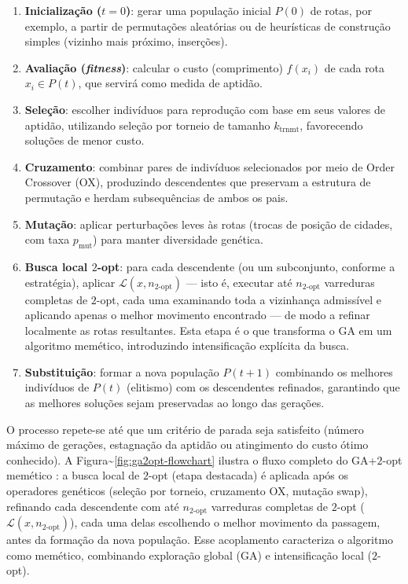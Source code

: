 \begin{enumerate}
  \def\labelenumi{\arabic{enumi}.}
  \tightlist
  \item
        \textbf{Inicialização (\(t=0\))}: gerar uma população inicial \(P(0)\)
        de rotas, por exemplo, a partir de permutações aleatórias ou de
        heurísticas de construção simples (vizinho mais próximo, inserções).
  \item
        \textbf{Avaliação (\emph{fitness})}: calcular o custo (comprimento)
        \(f(x_i)\) de cada rota \(x_i \in P(t)\), que servirá como medida de
        aptidão.
  \item
        \textbf{Seleção}: escolher indivíduos para reprodução com base em seus
        valores de aptidão, utilizando seleção por torneio de tamanho
        \(k_{\text{trnmt}}\), favorecendo soluções de menor custo.
  \item
        \textbf{Cruzamento}: combinar pares de indivíduos selecionados por
        meio de Order Crossover (OX), produzindo descendentes que preservam a
        estrutura de permutação e herdam subsequências de ambos os pais.
  \item
        \textbf{Mutação}: aplicar perturbações leves às rotas (trocas de
        posição de cidades, com taxa \(p_{\text{mut}}\)) para manter
        diversidade genética.
  \item
        \textbf{Busca local \(2\)-opt}: para cada descendente (ou um
        subconjunto, conforme a estratégia), aplicar
        \(\mathcal{L}(x, n_{2\text{-opt}})\) --- isto é, executar até
        \(n_{2\text{-opt}}\) varreduras completas de \(2\)-opt, cada uma
        examinando toda a vizinhança admissível e aplicando apenas o melhor
        movimento encontrado --- de modo a refinar localmente as rotas
        resultantes. Esta etapa é o que transforma o GA em um algoritmo
        memético, introduzindo intensificação explícita da busca.
  \item
        \textbf{Substituição}: formar a nova população \(P(t+1)\) combinando os melhores indivíduos de \(P(t)\) (elitismo) com os descendentes refinados, garantindo que as melhores soluções sejam preservadas ao longo das gerações.
\end{enumerate}

O processo repete-se até que um critério de parada seja satisfeito (número máximo de gerações, estagnação da aptidão ou atingimento do custo ótimo conhecido).
A Figura\textasciitilde{}\ref{fig:ga2opt-flowchart} ilustra o fluxo completo do GA+\(2\)-opt memético \autocite{larranaga1999genetic}: a busca local de \(2\)-opt (etapa destacada) é aplicada após os operadores genéticos (seleção por torneio, cruzamento OX, mutação swap), refinando cada descendente com até \(n_{2\text{-opt}}\) varreduras completas de \(2\)-opt (\(\mathcal{L}(x, n_{2\text{-opt}})\)), cada uma delas escolhendo o melhor movimento da passagem, antes da formação da nova população.
Esse acoplamento caracteriza o algoritmo como memético, combinando exploração global (GA) e intensificação local (\(2\)-opt).

